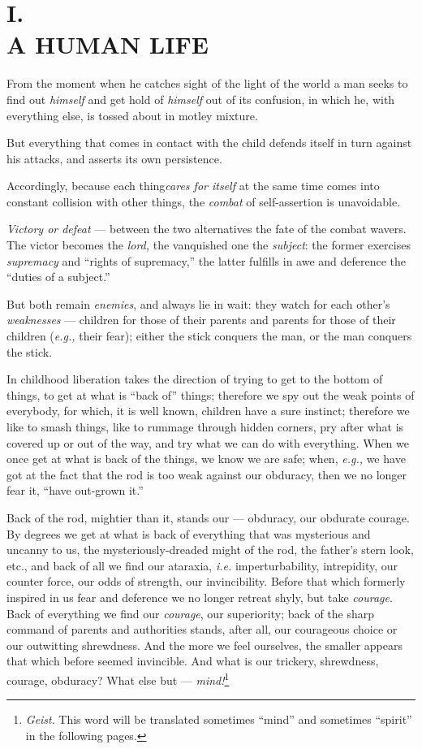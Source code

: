
\chapter[I. A Human Life]{\centering I.\\
A HUMAN LIFE}

From the moment when he catches sight of the light of the world a man seeks to 
find out \textit{himself} and get hold of \textit{himself} out of its 
confusion, in which he, with everything else, is tossed about in motley 
mixture.

But everything that comes in contact with the child defends itself in turn 
against his attacks, and asserts its own persistence.

Accordingly, because each thing\textit{cares for itself} at the same time 
comes into constant collision with other things, the \textit{combat} of 
self-assertion is unavoidable.

\textit{Victory or defeat} --- between the two alternatives the fate of the 
combat wavers. The victor becomes the \textit{lord,} the vanquished one the 
\textit{subject}: the former exercises \textit{supremacy} and ``rights of 
supremacy,'' the latter fulfills in awe and deference the ``duties of a 
subject.''

But both remain \textit{enemies}, and always lie in wait: they watch for each 
other's \textit{weaknesses} --- children for those of their parents and parents 
for those of their children (\textit{e.g.,} their fear); either the stick 
conquers the man, or the man conquers the stick.

In childhood liberation takes the direction of trying to get to the bottom of 
things, to get at what is ``back of'' things; therefore we spy out the weak 
points of everybody, for which, it is well known, children have a sure 
instinct; therefore we like to smash things, like to rummage through hidden 
corners, pry after what is covered up or out of the way, and try what we can 
do with everything. When we once get at what is back of the things, we know we 
are safe; when, \textit{e.g.,} we have got at the fact that the rod is too 
weak against our obduracy, then we no longer fear it, ``have out-grown it.''

Back of the rod, mightier than it, stands our --- obduracy, our obdurate 
courage. By degrees we get at what is back of everything that was mysterious 
and uncanny to us, the mysteriously-dreaded might of the rod, the father's 
stern look, etc., and back of all we find our ataraxia, \textit{i.e.} 
imperturbability, intrepidity, our counter force, our odds of strength, our 
invincibility. Before that which formerly inspired in us fear and deference we 
no longer retreat shyly, but take \textit{courage}. Back of everything we find 
our \textit{courage}, our superiority; back of the sharp command of parents 
and authorities stands, after all, our courageous choice or our outwitting 
shrewdness. And the more we feel ourselves, the smaller appears that which 
before seemed invincible. And what is our trickery, shrewdness, courage, 
obduracy? What else but --- \textit{mind!}\footnote{\textit{Geist}. This word 
will be translated sometimes ``mind'' and sometimes ``spirit'' in the 
following pages.}

